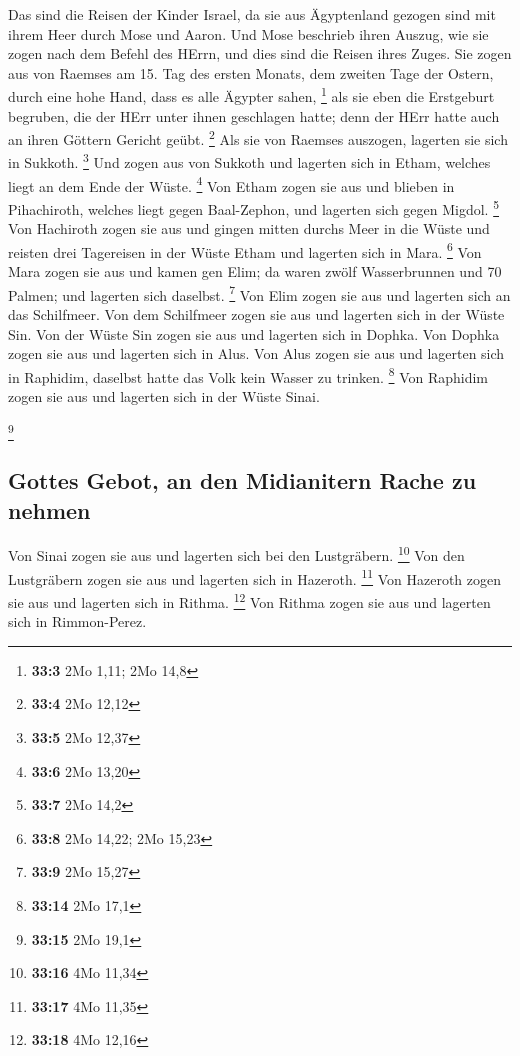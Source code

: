  Das sind die Reisen der Kinder Israel, da sie aus
Ägyptenland gezogen sind mit ihrem Heer durch Mose und Aaron.
 Und Mose beschrieb ihren Auszug, wie sie zogen nach dem
Befehl des HErrn, und dies sind die Reisen ihres Zuges. 
Sie zogen aus von Raemses am 15. Tag des ersten Monats, dem zweiten Tage
der Ostern, durch eine hohe Hand, dass es alle Ägypter sahen,
\footnote{\textbf{33:3} 2Mo 1,11; 2Mo 14,8}  als sie eben
die Erstgeburt begruben, die der HErr unter ihnen geschlagen hatte; denn
der HErr hatte auch an ihren Göttern Gericht geübt. \footnote{\textbf{33:4}
  2Mo 12,12}  Als sie von Raemses auszogen, lagerten sie
sich in Sukkoth. \footnote{\textbf{33:5} 2Mo 12,37}  Und
zogen aus von Sukkoth und lagerten sich in Etham, welches liegt an dem
Ende der Wüste. \footnote{\textbf{33:6} 2Mo 13,20}  Von
Etham zogen sie aus und blieben in Pihachiroth, welches liegt gegen
Baal-Zephon, und lagerten sich gegen Migdol. \footnote{\textbf{33:7} 2Mo
  14,2}  Von Hachiroth zogen sie aus und gingen mitten
durchs Meer in die Wüste und reisten drei Tagereisen in der Wüste Etham
und lagerten sich in Mara. \footnote{\textbf{33:8} 2Mo 14,22; 2Mo 15,23}
 Von Mara zogen sie aus und kamen gen Elim; da waren zwölf
Wasserbrunnen und 70 Palmen; und lagerten sich daselbst. \footnote{\textbf{33:9}
  2Mo 15,27}  Von Elim zogen sie aus und lagerten sich an
das Schilfmeer.  Von dem Schilfmeer zogen sie aus und
lagerten sich in der Wüste Sin.  Von der Wüste Sin zogen
sie aus und lagerten sich in Dophka.  Von Dophka zogen
sie aus und lagerten sich in Alus.  Von Alus zogen sie
aus und lagerten sich in Raphidim, daselbst hatte das Volk kein Wasser
zu trinken. \footnote{\textbf{33:14} 2Mo 17,1}  Von
Raphidim zogen sie aus und lagerten sich in der Wüste Sinai.

\footnote{\textbf{33:15} 2Mo 19,1}

\hypertarget{gottes-gebot-an-den-midianitern-rache-zu-nehmen}{%
\subsection{Gottes Gebot, an den Midianitern Rache zu
nehmen}\label{gottes-gebot-an-den-midianitern-rache-zu-nehmen}}

 Von Sinai zogen sie aus und lagerten sich bei den
Lustgräbern. \footnote{\textbf{33:16} 4Mo 11,34}  Von den
Lustgräbern zogen sie aus und lagerten sich in Hazeroth. \footnote{\textbf{33:17}
  4Mo 11,35}  Von Hazeroth zogen sie aus und lagerten
sich in Rithma. \footnote{\textbf{33:18} 4Mo 12,16}  Von
Rithma zogen sie aus und lagerten sich in Rimmon-Perez.

